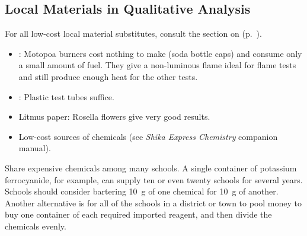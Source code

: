 \subsection{Local Materials in Qualitative Analysis}
For all low-cost local material substitutes, consult the section on  (p.~\pageref{cha:labequip}).
\begin{itemize}
\item{: Motopoa burners cost nothing to make (soda bottle caps) and consume only a small amount of fuel. They give a non-luminous flame ideal for flame tests and still produce enough heat for the other tests.}
\item{: Plastic test tubes suffice.}
\item{Litmus paper: Rosella flowers give very good results.}
\item{Low-cost sources of chemicals (see \emph{Shika Express Chemistry} companion manual).}
\end{itemize} 
Share expensive chemicals among many schools. A single container of potassium ferrocyanide, for example, can supply ten or even twenty schools for several years. Schools should consider bartering 10~g of one chemical for 10~g of another. Another alternative is for all of the schools in a district or town to pool money to buy one container of each required imported reagent, and then divide the chemicals evenly. 


